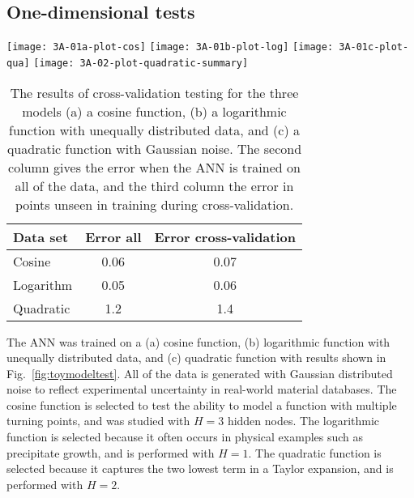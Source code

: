 \documentclass[review]{elsarticle}
\newcommand{\figref}[1]{Fig.~\ref{#1}}
\newcommand{\eqnref}[1]{Eq.~(\ref{#1})}
\newcommand{\change}[1]{#1}
\begin{document}
\subsection{One-dimensional tests}\label{sec:BasicTests}

\begin{figure*}
 \centering
 \texttt{[image: 3A-01a-plot-cos]}
 \texttt{[image: 3A-01b-plot-log]}
 \texttt{[image: 3A-01c-plot-qua]}
 \texttt{[image: 3A-02-plot-quadratic-summary]}
 \caption{Training an ANN on toy-model data for (a) a cosine function, (b) a
   logarithmic function with unequally distributed data, and (c) a quadratic
   function with Gaussian noise. (d) For the quadratic function, the
   performance with different number of hidden nodes is tested, and the rms
   (\eqnref{eq:rms}), the reduced rms (\eqnref{eq:rmsred}), and the
   cross-validation rms are computed and plotted.}
 \label{fig:toymodeltest}
\end{figure*}

\begin{table}
  \caption{\change{The results of cross-validation testing for the three
      models (a) a cosine function, (b) a logarithmic function with
      unequally distributed data, and (c) a quadratic function with Gaussian
      noise. The second column gives the error when the ANN is trained on
      all of the data, and the third column the error in points unseen in
      training during cross-validation.}}
\begin{tabular}{lcc}
  \bf{Data set}&
  \bf{Error all}&
  \bf{Error cross-validation}\\
  \hline
  Cosine&\num{0.06}&\num{0.07}\\
  Logarithm&\num{0.05}&\num{0.06}\\
  Quadratic&\num{1.2}&\num{1.4}
\end{tabular}
  \label{tab:3-01-cross}
\end{table}

The ANN was trained on a (a) cosine function, (b) logarithmic function with
unequally distributed data, and (c) quadratic function with results shown in
\figref{fig:toymodeltest}. All of the data is generated with Gaussian
distributed noise to reflect experimental uncertainty in real-world material
databases. The cosine function is selected to test the ability to model a
function with multiple turning points, and was studied with $H=3$ hidden
nodes.  The logarithmic function is selected because it often occurs in
physical examples such as precipitate growth, and is performed with
$H=1$. The quadratic function is selected because it captures the two lowest
term in a Taylor expansion, and is performed with $H=2$.
\end{document}
